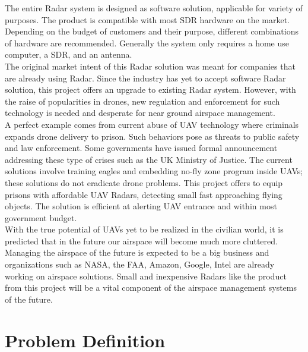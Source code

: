 \documentclass[twocolumn]{IEEEtran} %
\begin{document}
The entire Radar system is designed as software solution, applicable for variety of purposes. The product is compatible with most SDR hardware on the market. Depending on the budget of customers and their purpose, different combinations of hardware are recommended. Generally the system only requires a home use computer, a SDR, and an antenna. \\

The original market intent of this Radar solution was meant for companies that are already using Radar. Since the industry has yet to accept software Radar solution, this project offers an upgrade to existing Radar system. However, with the raise of popularities in drones, new regulation and enforcement for such technology is needed and desperate for near ground airspace management.\\

A perfect example comes from current abuse of UAV technology where criminals expands drone delivery to prison. Such behaviors pose as threats to public safety and law enforcement. Some governments have issued formal announcement addressing these type of crises such as the UK Ministry of Justice\cite{noauthor_uk_2016}. The current solutions involve training eagles and embedding no-fly zone program inside UAVs; these solutions do not eradicate drone problems. This project offers to equip prisons with affordable UAV Radars, detecting small fast approaching flying objects. The solution is efficient at alerting UAV entrance and within most government budget.\\


With the true potential of UAVs yet to be realized in the civilian world, it is predicted that in the future our airspace will become much more cluttered. Managing the airspace of the future is expected to be a big business and organizations such as NASA, the FAA, Amazon, Google, Intel are already working on airspace solutions\cite{gipson_nasa_2017}. Small and inexpensive Radars like the product from this project will be a vital component of the airspace management systems of the future.
\section{Problem Definition}
\end{document}

